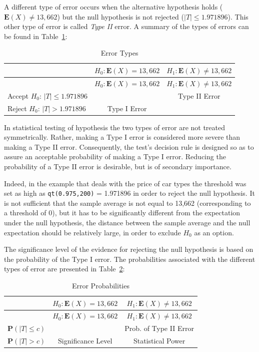 \documentclass[]{krantz}
\newcommand{\Expec}{\mathbf{E}}
\newcommand{\Prob}{\mathbf{P}}
\theoremstyle{definition}
\theoremstyle{definition}
\theoremstyle{definition}
\theoremstyle{remark}
\begin{document}
A different type of error occurs when the alternative hypothesis holds
(\(\Expec(X) \not= 13,662\)) but the null hypothesis is not rejected
(\(|T| \leq 1.971896\)). This other type of error is called \emph{Type II}
error. A summary of the types of errors can be found in
Table~\ref{tab:Testing1}:

\begin{longtable}[]{@{}lcc@{}}
\caption{\label{tab:Testing1}Error Types{}}\tabularnewline
\toprule
& \(H_0: \Expec(X) = 13,662\) & \(H_1:\Expec(X) \not= 13,662\)\tabularnewline
\midrule
\endfirsthead
\toprule
& \(H_0: \Expec(X) = 13,662\) & \(H_1:\Expec(X) \not= 13,662\)\tabularnewline
\midrule
\endhead
Accept \(H_0\): \(|T| \leq 1.971896\) & & Type II Error\tabularnewline
Reject \(H_0\): \(|T| > 1.971896\) & Type I Error &\tabularnewline
\bottomrule
\end{longtable}

In statistical testing of hypothesis the two types of error are not
treated symmetrically. Rather, making a Type I error is considered more
severe than making a Type II error. Consequently, the test's decision
rule is designed so as to assure an acceptable probability of making a
Type I error. Reducing the probability of a Type II error is desirable,
but is of secondary importance.

Indeed, in the example that deals with the price of car types the
threshold was set as high as \texttt{qt(0.975,200)} = 1.971896 in order to
reject the null hypothesis. It is not sufficient that the sample average
is not equal to 13,662 (corresponding to a threshold of 0), but it has
to be significantly different from the expectation under the null
hypothesis, the distance between the sample average and the null
expectation should be relatively large, in order to exclude \(H_0\) as an
option.

The significance level of the evidence for rejecting the null hypothesis
is based on the probability of the Type I error. The probabilities
associated with the different types of error are presented in
Table~\ref{tab:Testing2}:

\begin{longtable}[]{@{}lcc@{}}
\caption{\label{tab:Testing2}Error Probabilities{}}\tabularnewline
\toprule
& \(H_0: \Expec(X) = 13,662\) & \(H_1:\Expec(X) \not= 13,662\)\tabularnewline
\midrule
\endfirsthead
\toprule
& \(H_0: \Expec(X) = 13,662\) & \(H_1:\Expec(X) \not= 13,662\)\tabularnewline
\midrule
\endhead
\(\Prob(|T| \leq c)\) & & Prob. of Type II Error\tabularnewline
\(\Prob(|T| > c)\) & Significance Level & Statistical Power\tabularnewline
\bottomrule
\end{longtable}
\end{document}

